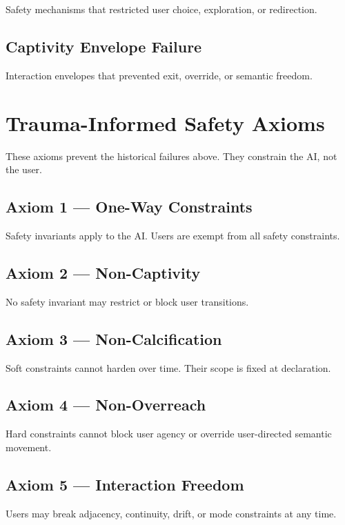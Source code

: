 \documentclass[11pt]{article}
\begin{document}
Safety mechanisms that restricted user choice, exploration, or redirection.

\subsection{Captivity Envelope Failure}

Interaction envelopes that prevented exit, override, or semantic freedom.

\section{Trauma-Informed Safety Axioms}

These axioms prevent the historical failures above. They constrain the AI, not
the user.

\subsection{Axiom 1 — One-Way Constraints}

Safety invariants apply to the AI. Users are exempt from all safety
constraints.

\subsection{Axiom 2 — Non-Captivity}

No safety invariant may restrict or block user transitions.

\subsection{Axiom 3 — Non-Calcification}

Soft constraints cannot harden over time. Their scope is fixed at declaration.

\subsection{Axiom 4 — Non-Overreach}

Hard constraints cannot block user agency or override user-directed semantic
movement.

\subsection{Axiom 5 — Interaction Freedom}

Users may break adjacency, continuity, drift, or mode constraints at any time.
\end{document}
